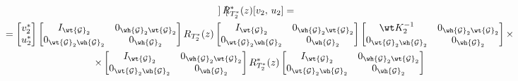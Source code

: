\begin{pf}
\begin{gather*}
\begin{bmatrix}
\end{bmatrix}R_{T_2^*}^*(z)[v_2,\, u_2]=\\


%


=\begin{bmatrix} v_2^* \\ u_2^* \end{bmatrix}


\begin{bmatrix}


I_{\wt {\cal G}_2} & 0_{\wh {\cal G}_2 \wt {\cal G}_2} \\


0_{\wt {\cal G}_2 \wh {\cal G}_2} & 0_{\wh {\cal G}_2}


\end{bmatrix}


R_{T_2^*}(z)


\begin{bmatrix}


I_{\wt {\cal G}_2} & 0_{\wh {\cal G}_2 \wt {\cal G}_2 } \\


0_{\wt {\cal G}_2 \wh {\cal G}_2 } & 0_{ \wh {\cal G}_2 }


\end{bmatrix}


\begin{bmatrix}


\wt K_2^{-1} & 0_{\wh {\cal G}_2 \wt {\cal G}_2} \\


0_{\wt {\cal G}_2 \wh {\cal G}_2} & 0_{\wh {\cal G}_2}


\end{bmatrix}


\times \\ \times


\begin{bmatrix}


I_{\wt {\cal G}_2} & 0_{\wh {\cal G}_2 \wt {\cal G}_2} \\


0_{\wt {\cal G}_2 \wh {\cal G}_2} & 0_{\wh {\cal G}_2}


\end{bmatrix}


R_{T_2^*}^*(z)


\begin{bmatrix}


I_{\wt {\cal G}_2} & 0_{\wh {\cal G}_2 \wt {\cal G}_2} \\


0_{\wt {\cal G}_2 \wh {\cal G}_2} & 0_{\wh {\cal G}_2}



\end{bmatrix}
\end{gather*}
\end{pf}

